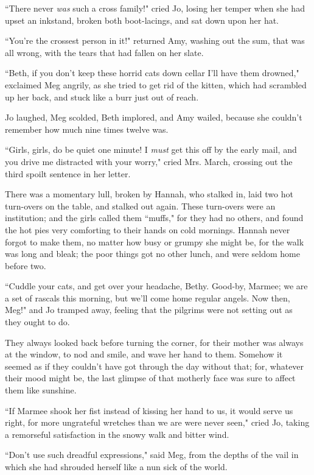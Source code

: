 ``There never \emph{was} such a cross family!" cried Jo, losing her
temper when she had upset an inkstand, broken both boot-lacings, and sat
down upon her hat.

``You're the crossest person in it!" returned Amy,
washing out the sum, that was all wrong, with the tears that had fallen
on her slate.

``Beth, if you don't keep these horrid cats down cellar
I'll have them drowned," exclaimed Meg angrily, as she
tried to get rid of the kitten, which had scrambled up her back, and
stuck like a burr just out of reach.

Jo laughed, Meg scolded, Beth implored, and Amy wailed, because she
couldn't remember how much nine times twelve was.

``Girls, girls, do be quiet one minute! I \emph{must} get this off by the
early mail, and you drive me distracted with your worry," cried Mrs.
March, crossing out the third spoilt sentence in her letter.

There was a momentary lull, broken by Hannah, who stalked in, laid two
hot turn-overs on the table, and stalked out again. These turn-overs
were an institution; and the girls called them ``muffs," for they had no
others, and found the hot pies very comforting to their hands on cold
mornings. Hannah never forgot to make them, no matter how busy or grumpy
she might be, for the walk was long and bleak; the poor things got no
other lunch, and were seldom home before two.

``Cuddle your cats, and get over your headache, Bethy. Good-by, Marmee;
we are a set of rascals this morning, but we'll come
home regular angels. Now then, Meg!" and Jo tramped away, feeling that
the pilgrims were not setting out as they ought to do.

They always looked back before turning the corner, for their mother was
always at the window, to nod and smile, and wave her hand to them.
Somehow it seemed as if they couldn't have got through
the day without that; for, whatever their mood might be, the last
glimpse of that motherly face was sure to affect them like sunshine.

``If Marmee shook her fist instead of kissing her hand to us, it would
serve us right, for more ungrateful wretches than we are were never
seen," cried Jo, taking a remorseful satisfaction in the snowy walk and
bitter wind.

``Don't use such dreadful expressions," said Meg, from
the depths of the vail in which she had shrouded herself like a nun sick
of the world.

